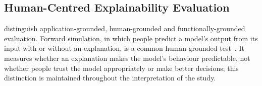 \subsection{Human-Centred Explainability Evaluation}

\citet{doshivelez2018considerations} distinguish application-grounded, human-grounded and
functionally-grounded evaluation. Forward simulation, in which people predict a model's output from
its input with or without an explanation, is a common human-grounded test~\citep{hase2020forward}.
It measures whether an explanation makes the model's behaviour predictable, not whether people
trust the model appropriately or make better decisions; this distinction is maintained throughout
the interpretation of the study.
